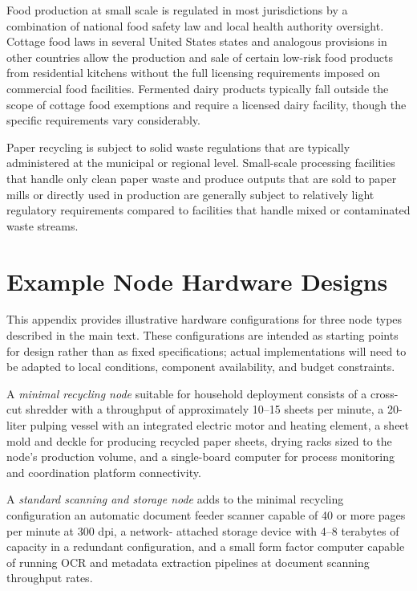 \documentclass[12pt]{book}
\theoremstyle{definition}
\theoremstyle{remark}
\begin{document}
Food production at small scale is regulated in most jurisdictions
by a combination of national food safety law and local health
authority oversight. Cottage food laws in several United States
states and analogous provisions in other countries allow the
production and sale of certain low-risk food products from
residential kitchens without the full licensing requirements
imposed on commercial food facilities. Fermented dairy products
typically fall outside the scope of cottage food exemptions and
require a licensed dairy facility, though the specific requirements
vary considerably.

Paper recycling is subject to solid waste regulations that are
typically administered at the municipal or regional level. Small-scale
processing facilities that handle only clean paper waste and produce
outputs that are sold to paper mills or directly used in production
are generally subject to relatively light regulatory requirements
compared to facilities that handle mixed or contaminated waste streams.

\chapter{Example Node Hardware Designs}

This appendix provides illustrative hardware configurations for
three node types described in the main text. These configurations
are intended as starting points for design rather than as fixed
specifications; actual implementations will need to be adapted to
local conditions, component availability, and budget constraints.

A \emph{minimal recycling node} suitable for household deployment
consists of a cross-cut shredder with a throughput of approximately
10--15 sheets per minute, a 20-liter pulping vessel with an
integrated electric motor and heating element, a sheet mold and
deckle for producing recycled paper sheets, drying racks sized
to the node's production volume, and a single-board computer
for process monitoring and coordination platform connectivity.

A \emph{standard scanning and storage node} adds to the minimal
recycling configuration an automatic document feeder scanner
capable of 40 or more pages per minute at 300 dpi, a network-
attached storage device with 4--8 terabytes of capacity in a
redundant configuration, and a small form factor computer
capable of running OCR and metadata extraction pipelines at
document scanning throughput rates.
\end{document}
